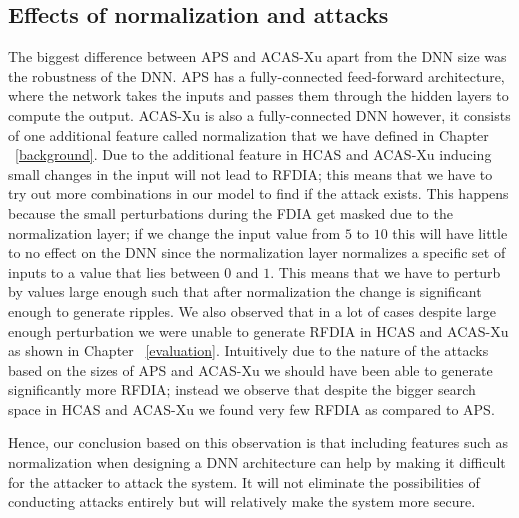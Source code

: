 \subsection{Effects of normalization and attacks}
The biggest difference between \ac{APS} and \ac{ACAS-Xu} apart from the \ac{DNN} size was the robustness of the \ac{DNN}. 
\ac{APS} has a fully-connected feed-forward architecture, where the network takes the inputs and passes them through the hidden layers to compute the output. 
\ac{ACAS-Xu} is also a fully-connected \ac{DNN} however, it consists of one additional feature called normalization that we have defined in Chapter ~\ref{background}.
Due to the additional feature in \ac{HCAS} and \ac{ACAS-Xu} inducing small changes in the input will not lead to \ac{RFDIA}; this means that we have to try out more combinations in our model to find if the attack exists. 
This happens because the small perturbations during the \ac{FDIA} get masked due to the normalization layer; if we change the input value from $5$ to $10$ this will have little to no effect on the \ac{DNN} since the normalization layer normalizes a specific set of inputs to a value that lies between $0$ and $1$. 
This means that we have to perturb by values large enough such that after normalization the change is significant enough to generate ripples. 
We also observed that in a lot of cases despite large enough perturbation we were unable to generate \ac{RFDIA} in \ac{HCAS} and \ac{ACAS-Xu} as shown in Chapter ~\ref{evaluation}.
Intuitively due to the nature of the attacks based on the sizes of \ac{APS} and \ac{ACAS-Xu} we should have been able to generate significantly more \ac{RFDIA}; instead we observe that despite the bigger search space in \ac{HCAS} and \ac{ACAS-Xu} we found very few \ac{RFDIA} as compared to \ac{APS}. 


Hence, our conclusion based on this observation is that including features such as normalization when designing a \ac{DNN} architecture can help by making it difficult for the attacker to attack the system. 
It will not eliminate the possibilities of conducting attacks entirely but will relatively make the system more secure. 

